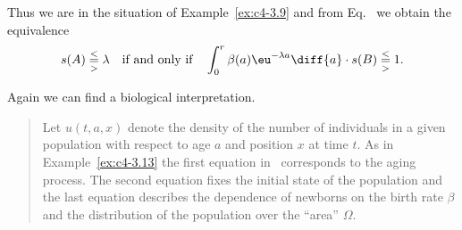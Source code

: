 \begin{example}
Thus we are in the situation of Example~\ref{ex:c4-3.9} and from Eq.~ we obtain the equivalence
\[
s(A) \overset{<}{ \underset{>}{=} } \lambda \quad \text{if and only if} \quad \int_{0}^{r} \beta(a)\eu^{-\lambda a} \diff{a} \cdot s(B) \overset{<}{ \underset{>}{=} } 1 .
\]
\end{example}
Again we can find a biological interpretation.
\begin{quote}
Let $u(t,a,x)$ denote the density of the number of individuals in a given population with respect to age $a$ and position $x$ at time $t$.
As in Example~\ref{ex:c4-3.13} the first equation in~ corresponds to the aging process.
The second equation fixes the initial state of the population and the last equation describes the dependence of newborns on the birth rate $\beta$ and the distribution of the population over the \enquote{area} $\Omega$. 
\end{quote}
